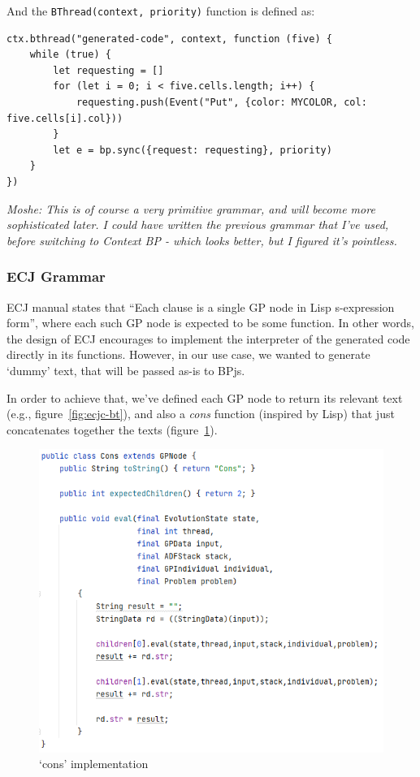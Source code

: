 \documentclass{article}
\newcommand{\code}{\texttt}
\begin{document}
And the \code{BThread(context, priority)} function is defined as:

\begin{verbatim}
ctx.bthread("generated-code", context, function (five) {
    while (true) {
        let requesting = []
        for (let i = 0; i < five.cells.length; i++) {
            requesting.push(Event("Put", {color: MYCOLOR, col: five.cells[i].col}))
        }
        let e = bp.sync({request: requesting}, priority)
    }
})
\end{verbatim}

\emph{Moshe: This is of course a very primitive grammar, and will become more sophisticated later. I could have written
the previous grammar that I've used, before switching to Context BP - which looks better, but I figured it's pointless.}


\subsubsection{ECJ Grammar}
ECJ manual states that ``Each clause is a single GP node in Lisp s-expression form'', where each such GP node is
expected to be some function.
In other words, the design of ECJ encourages to implement the interpreter of the generated code directly in its
functions.
However, in our use case, we wanted to generate `dummy' text, that will be passed as-is to BPjs.

In order to achieve that, we've defined each GP node to return its relevant text (e.g., figure~\ref{fig:ecjc-bt}),
and also a \emph{cons} function (inspired by Lisp) that just concatenates together the texts (figure~\ref{fig:ecjc-cons}).

\begin{figure}[h]
    \includegraphics[width=\textwidth]{ecj-cons}
    \caption{`cons' implementation}
    \label{fig:ecjc-cons}
\end{figure}
\end{document}
